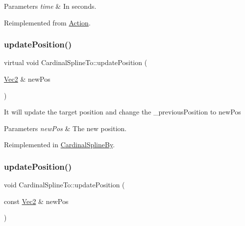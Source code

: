 \begin{DoxyParams}{Parameters}
{\em time} & In seconds. \\
\hline
\end{DoxyParams}


Reimplemented from \hyperlink{classAction_a937e646e63915e33ad05ba149bfcf239}{Action}.

\mbox{\label{classCardinalSplineTo_a3ab5cf5c0296a69e675c42293c82a606}} 
\subsubsection{\texorpdfstring{update\+Position()}{updatePosition()}\hspace{0.1cm}{\footnotesize\ttfamily [1/2]}}
{\footnotesize\ttfamily virtual void Cardinal\+Spline\+To\+::update\+Position (\begin{DoxyParamCaption}\item[{\hyperlink{classVec2}{Vec2} \&}]{new\+Pos }\end{DoxyParamCaption})\hspace{0.3cm}{\ttfamily [virtual]}}

It will update the target position and change the \+\_\+previous\+Position to new\+Pos


\begin{DoxyParams}{Parameters}
{\em new\+Pos} & The new position. \\
\hline
\end{DoxyParams}


Reimplemented in \hyperlink{classCardinalSplineBy_af49fedd4b7c5ef7c1a8cd58773c5644e}{Cardinal\+Spline\+By}.

\mbox{\label{classCardinalSplineTo_a18b90e37ad31dd48a7aaa611e6608369}} 
\subsubsection{\texorpdfstring{update\+Position()}{updatePosition()}\hspace{0.1cm}{\footnotesize\ttfamily [2/2]}}
{\footnotesize\ttfamily void Cardinal\+Spline\+To\+::update\+Position (\begin{DoxyParamCaption}\item[{const \hyperlink{classVec2}{Vec2} \&}]{new\+Pos }\end{DoxyParamCaption})\hspace{0.3cm}{\ttfamily [virtual]}}

